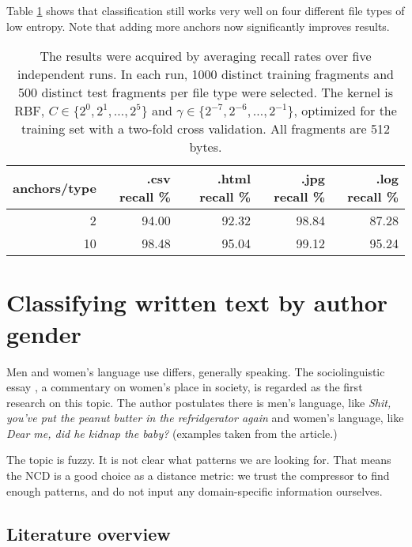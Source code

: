 Table \ref{table:csv_html_jpg_log_recall} shows that classification still
works very well on four different file types of low entropy. Note that
adding more anchors now significantly improves results.


\begin{table}[h]
\begin{tabular}{rrrrr}
\hline
   anchors/type &   .csv recall \% &   .html recall \% &   .jpg recall \% &   .log recall \% \\
\hline
              2 &           94.00    &            92.32 &           98.84 &           87.28 \\
             10 &           98.48 &            95.04 &           99.12 &           95.24 \\
\hline
\end{tabular}
\caption{
The results were acquired by averaging recall rates over five
independent runs. In each run, 1000 distinct training fragments and 500
distinct test fragments per file type were selected. The kernel is RBF, $C
\in \{ 2^{0}, 2^{1}, \dots, 2^{5} \}$ and $\gamma \in \{2^{-7}, 2^{-6},
\dots, 2^{-1} \}$, optimized for the training set with a two-fold cross
validation. All fragments are 512 bytes.}
\label{table:csv_html_jpg_log_recall}
\end{table}


\section{Classifying written text by author gender}

Men and women's language use differs, generally speaking. The
sociolinguistic essay \cite{Lakoff1973}, a commentary on women's place in
society, is regarded as the first research on this topic. The author
postulates there is men's language, like \emph{Shit, you've put the peanut
butter in the refridgerator again} and women's language, like \emph{Dear
me, did he kidnap the baby?} (examples taken from the article.)

The topic is fuzzy. It is not clear what patterns we are looking for.
That means the NCD is a good choice as a distance metric: we trust the compressor to find enough patterns, and do not input any domain-specific information ourselves.

\subsection{Literature overview}

